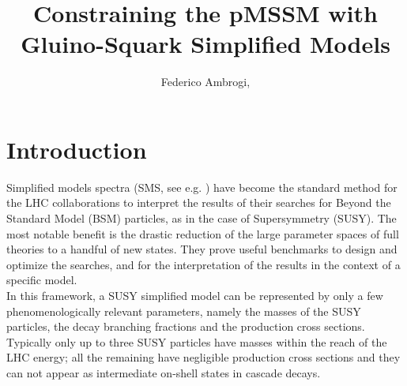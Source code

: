 \documentclass[a4paper,11pt]{article}
\title{{\boldmath Constraining the pMSSM  with \\ Gluino-Squark Simplified Models}}
\author[a,]{Federico Ambrogi,\note{Corresponding author.}}
\affiliation[a]{Department of Meteorology and Geophysics, University of Vienna, Vienna, Austria}
\begin{document}
 
\maketitle
\flushbottom
\section{Introduction}
Simplified models spectra (SMS, see e.g. \cite{Alwall:2008ag,Alves:2011wf}) have become the standard method for the LHC collaborations to interpret the results of their searches for Beyond the Standard Model (BSM) particles, as in the case of Supersymmetry (SUSY). The most notable benefit is the drastic reduction of the large parameter spaces of full theories to a handful of new states. They prove useful benchmarks to design and optimize the searches, and for the interpretation of the results in the context of a specific model. 
\\
In this framework, a SUSY simplified model can be represented by only a few phenomenologically relevant parameters, namely the masses of the SUSY particles, the decay branching fractions and the production cross sections. Typically only up to three SUSY particles have masses within the reach of the LHC energy; all the remaining have negligible production cross sections and they can not appear as intermediate on-shell states in cascade decays.
\end{document}
